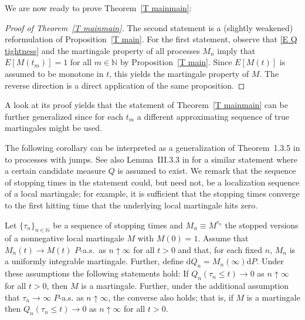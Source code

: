 We are now ready to prove Theorem~\ref{T mainmain}:

\begin{proof}[Proof of Theorem~\protect\ref{T mainmain}] The second statement is a (slightly weakened) reformulation of Proposition~\ref{T main}.
For the first statement, observe that \eqref{E Q tightness} and the
martingale property of all processes $M_{n}$ imply that $E[M(t_{m})] = 1$
for all $m \in\mathbb{N}$ by Proposition~\ref{T main}. Since $E[M(t)]$ is
assumed to be monotone in $t$, this yields the martingale property of $M$.
The reverse direction is a direct application of the same proposition.
\end{proof}

A look at its proof yields that the statement of Theorem~\ref{T mainmain}
can be further generalized since for each $t_{m}$ a different approximating
sequence of true martingales might be used.

The following corollary can be interpreted as a generalization of
Theorem~1.3.5 in \citet{SV_multi} to processes with jumps. See also
Lemma~III.3.3 in \citet{JacodS} for a similar statement where a certain
candidate measure $Q$ is assumed to exist. We remark that the sequence of
stopping times in the statement could, but need not, be a localization
sequence of a local martingale; for example, it is sufficient that the
stopping times converge to the first hitting time that the underlying local
martingale hits zero.

\begin{corollary}
\label{cor stopping times} Let $\{\tau _{n}\}_{n\in \mathbb{N}}$ be a
sequence of stopping times and $M_{n}\equiv M^{\tau _{n}}$ the stopped
versions of a nonnegative local martingale $M$ with $M(0)=1$. Assume that $%
M_{n}(t)\rightarrow M(t)$ $P$-a.s.~as $n\uparrow \infty $ for all $t>0$ and
that, for each fixed $n$, $M_{n}$ is a uniformly integrable martingale.
Further, define $\mathrm{d}Q_{n}=M_{n}(\infty )\mathrm{d}P$. Under these
assumptions the following statements hold: If $Q_{n}(\tau _{n}\leq
t)\rightarrow 0$ as $n\uparrow \infty $ for all $t>0$, then $M$ is a
martingale. Further, under the additional assumption that $\tau
_{n}\rightarrow \infty $ $P$-a.s. as $n\uparrow \infty $, the converse also
holds; that is, if $M$ is a martingale then $Q_{n}(\tau _{n}\leq
t)\rightarrow 0$ as $n\uparrow \infty $ for all $t>0$.
\end{corollary}

